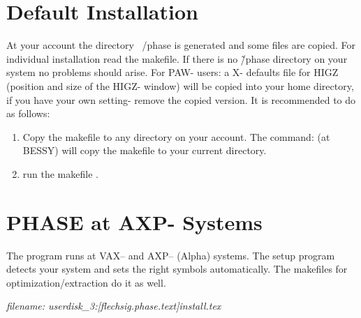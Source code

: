 \section{Default Installation}
At your account the directory ~/phase is generated and some files are copied.
For individual installation read the makefile. If there is no \~/phase directory
on your system no problems should arise. For PAW- users: a X- defaults file for
HIGZ (position and size of the HIGZ- window) will 
be copied into your home directory, if you have your own setting- remove the
copied version. 
It is recommended to do as follows:
\begin{enumerate}         
   \item Copy the makefile to any directory on your account. The command:  
   (at BESSY)  will copy the makefile
   to your current directory. 
  \item run the makefile  .
\end{enumerate}



\section{PHASE at AXP- Systems}
The \phase program runs at VAX-- and AXP-- (Alpha) systems. The  setup
program  detects your system and sets the right symbols
automatically. The makefiles for optimization/extraction do it as well.

{\it filename: userdisk\_3:[flechsig.phase.text]install.tex}  
